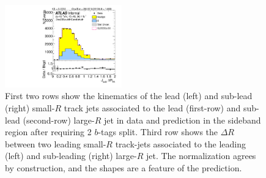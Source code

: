 \begin{figure}[htbp!]
\begin{center}
\includegraphics[width=0.45\textwidth,angle=-90]{figures/boosted/Sideband/b77_TwoTag_split_Sideband_sublHCand_trk_dr.pdf}
  \caption{First two rows show the kinematics of the lead (left) and sub-lead (right) small-$R$ track jets associated to the lead (first-row) and sub-lead (second-row) large-$R$ jet in data and prediction in the sideband region after requiring 2 $b$-tags split. Third row shows the $\Delta R$ between two leading small-$R$ track-jets associated to the leading (left) and sub-leading (right) large-$R$ jet. The normalization agrees by construction, and the shapes are a feature of the prediction. }
  \label{fig:boosted-2bs-sideband-ak2}
\end{center}
\end{figure}



